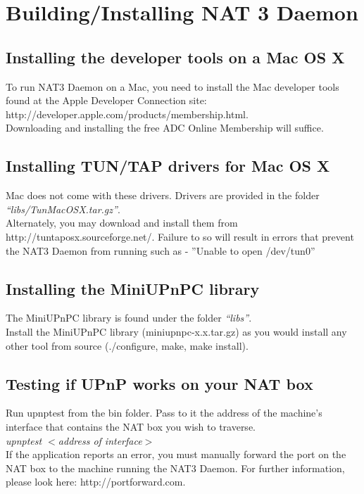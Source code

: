 \section{Building/Installing NAT 3 Daemon}

\subsection{Installing the developer tools on a Mac OS X}
To run NAT3 Daemon on a Mac, you need to install the Mac developer tools found at the Apple Developer Connection site: http://developer.apple.com/products/membership.html.\\

Downloading and installing the free ADC Online Membership will suffice.

\subsection{Installing TUN/TAP drivers for Mac OS X}
Mac does not come with these drivers. Drivers are provided in the folder \textit{``libs/TunMacOSX.tar.gz''}.\\
    
Alternately,  you may download and install them from http://tuntaposx.sourceforge.net/. Failure to so will result in errors that prevent the NAT3 Daemon from running such as - ”Unable to open /dev/tun0”

\subsection{Installing the MiniUPnPC library}
\label{sec:dns_rr_gen}
The MiniUPnPC library is found under the folder \textit{``libs''}.\\
Install the MiniUPnPC library (miniupnpc-x.x.tar.gz) as you would install any other tool from source (./configure, make, make install).

\subsection{Testing if UPnP works on your NAT box}
Run upnptest from the bin folder. Pass to it the address of the machine’s interface that contains the NAT box you wish to traverse.\\
\textit{upnptest $<$address of interface$>$}\\

If the application reports an error, you must manually forward the port on the NAT box to the machine running the NAT3 Daemon. For further information, please look here: http://portforward.com.

